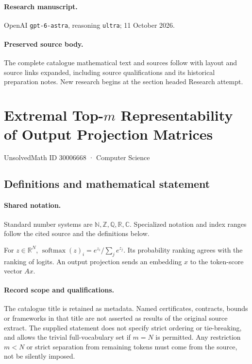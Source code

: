 \documentclass[11pt]{article}
\begin{document}
\paragraph{Research manuscript.} OpenAI \texttt{gpt-6-astra}, reasoning \texttt{ultra}; 11 October 2026.
\paragraph{Preserved source body.} The complete catalogue mathematical text and sources follow with layout and source links expanded, including source qualifications and its historical preparation notes. New research begins at the section headed Research attempt.

\section{Extremal Top-$m$ Representability of Output Projection Matrices}\label{30006668}
{\small UnsolvedMath ID 30006668 · Computer Science}
\subsection{Definitions and mathematical statement}

\paragraph{Shared notation.}Standard number systems are $\mathbb N,\mathbb Z,\mathbb Q,\mathbb R,\mathbb C$. Specialized notation and index ranges follow the cited source and the definitions below.


For $z\in\mathbb R^N$, $\operatorname{softmax}(z)_i=e^{z_i}/\sum_j e^{z_j}$. Its probability ranking agrees with the ranking of logits. An output projection sends an embedding $x$ to the token-score vector $Ax$.
\paragraph{Record scope and qualifications.}
The catalogue title is retained as metadata. Named certificates, contracts, bounds or frameworks in that title are not asserted as results of the original source extract.
The supplied statement does not specify strict ordering or tie-breaking, and allows the trivial full-vocabulary set if $m=N$ is permitted. Any restriction $m<N$ or strict separation from remaining tokens must come from the source, not be silently imposed.
\end{document}
